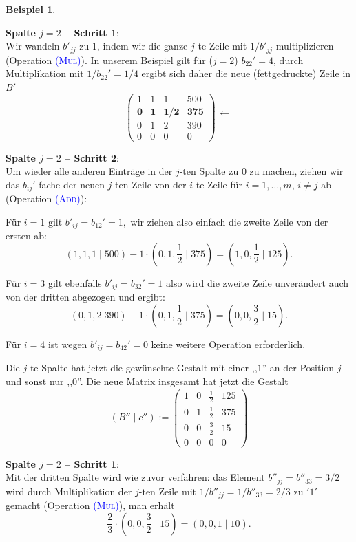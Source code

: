 \documentclass[a4paper,11pt,oneside]{article}
\theoremstyle{definition}
\newtheorem{example}{Beispiel}
\def\OP#1{\textcolor{blue}{(\textnormal{\textrm{\textsc{#1}})}}}
\begin{document}
\begin{example}
\begin{enumerate}
\textbf{Spalte $j=2$ -- Schritt 1}:~\\
Wir wandeln $b'_{jj}$ zu $1$, indem wir die ganze $j$-te Zeile mit $1/b'_{jj}$ multiplizieren (Operation \OP{Mul}). In unserem Beispiel gilt für ($j=2$) $b_{22}'=4$, durch Multiplikation mit $1/b_{22}'=1/4$ ergibt sich daher die neue (fettgedruckte) Zeile in $B'$
$$
\left(\begin{array}{ccc|c}
1&1&1&500\\
\mathbf{0}&\mathbf{1}&\mathbf{1/2}&\mathbf{375}\\
0&1&2&390\\
0&0&0&0
\end{array}\right)
\begin{matrix}
~\\\leftarrow\\~\\~\\
\end{matrix}
$$

\textbf{Spalte $j=2$ -- Schritt 2}:~\\
Um wieder alle anderen Einträge in der $j$-ten Spalte zu $0$ zu machen, ziehen wir das $b_{ij}'$-fache der neuen $j$-ten Zeile von der $i$-te Zeile für $i=1,\ldots,m$, $i\neq j$ ab (Operation \OP{Add}):

Für $i=1$ gilt $b'_{ij}=b_{12}'=1,$ wir ziehen also  einfach die zweite Zeile von der ersten ab:
\[
(1,1,1\mid 500)-1\cdot
\left(0,1,\frac{1}{2}\mid375\right)=\left(1,0,\frac{1}{2}\mid 125\right).
\]

Für $i=3$ gilt ebenfalls $b'_{ij}=b_{32}'=1$ also wird die zweite Zeile unverändert auch von der dritten abgezogen und ergibt:
\[
(0,1,2|390)-1\cdot
\left(0,1,\frac{1}{2} \mid 375\right) =
\left(0,0, \frac{3}{2}\mid 15\right).
\]

Für $i=4$ ist wegen $b'_{ij}=b_{42}'=0$ keine weitere Operation erforderlich.

Die $j$-te Spalte hat jetzt die gewünschte Gestalt mit einer ,,$1$'' an der Position $j$ und sonst nur ,,$0$''. Die neue Matrix insgesamt hat jetzt die Gestalt
$$
(B''\mid c''):=\left(\begin{array}{ccc|c}
1&0&\frac{1}{2}&125\\
0&1&\frac{1}{2}&375\\
0&0&\frac{3}{2}&15\\
0&0&0&0
\end{array}\right)
$$

\textbf{Spalte $j=2$ -- Schritt 1}:~\\
Mit der dritten Spalte wird wie zuvor verfahren: das Element $b''_{jj}=b''_{33}=3/2$ wird durch Multiplikation der $ j$-ten Zeile mit $1/b''_{jj}=1/b''_{33}=2/3$ zu $ '1'$ gemacht (Operation \OP{Mul}), man erhält
$$
\frac{2}{3}\cdot(0,0,\frac{3}{2}\mid 15) = \left(0,0,1\mid 10\right).
$$


\end{enumerate}
\end{example}
\end{document}
